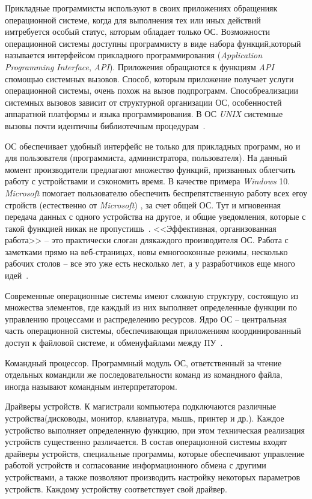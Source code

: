 Прикладные программисты используют в своих приложениях обращенияк операционной системе, когда для выполнения тех или иных действий имтребуется   особый   статус,   которым   обладает   только   ОС.   Возможности операционной   системы   доступны   программисту   в   виде   набора   функций,который называется интерфейсом прикладного программирования (\textit{Application Programming}   \textit{Interface},  \textit{API}).   Приложения   обращаются   к   функциям   \textit{API}   спомощью системных вызовов. Способ, которым приложение получает услуги операционной   системы,   очень   похож   на   вызов   подпрограмм.   Способреализации   системных   вызовов   зависит   от   структурной   организации   ОС, особенностей аппаратной платформы и языка программирования. В ОС \textit{UNIX} системные вызовы почти идентичны библиотечным процедурам~\cite{Oc1}.

ОС   обеспечивает   удобный   интерфейс   не   только   для   прикладных программ,   но   и   для   пользователя   (программиста,   администратора, пользователя). На данный момент производители предлагают множество функций, призванных облегчить работу с устройствами и сэкономить время. В качестве примера \textit{Windows}  10.  \textit{Microsoft} помогает   пользователю   обеспечить   беспрепятственную   работу   всех   егоу стройств (естественно от  \textit{Microsoft}) , за счет общей ОС. Тут и мгновенная передача данных с одного устройства на другое, и общие уведомления, которые с такой функцией никак не пропустишь~\cite{linuxOffDoc}. <<Эффективная, организованная работа>>  – это практически слоган длякаждого производителя ОС. Работа с заметками прямо на веб-страницах, новы емногооконные режимы, несколько рабочих столов – все это уже есть несколько лет, а у разработчиков еще много идей~\cite{linuxOffDoc}.

Современные   операционные   системы   имеют   сложную   структуру, состоящую   из   множества   элементов,   где   каждый   из   них   выполняет определенные функции по управлению процессами и распределению ресурсов.
Ядро ОС – центральная часть операционной системы, обеспечивающая приложениям   координированный   доступ   к   файловой   системе,   и   обменуфайлами между ПУ~\cite{Oc2}.

Командный процессор. Программный модуль ОС, ответственный за чтение отдельных командили же последовательности команд из командного файла, иногда называют командным интерпретатором.

Драйверы устройств. К магистрали  компьютера подключаются различные устройства(дисководы,   монитор,   клавиатура,   мышь,   принтер   и   др.).   Каждое устройство выполняет определенную функцию, при этом техническая реализация устройств существенно различается. В состав операционной системы входят драйверы устройств, специальные программы, которые обеспечивают   управление   работой   устройств   и   согласование информационного обмена с другими устройствами, а также позволяют производить   настройку   некоторых   параметров   устройств.   Каждому устройству соответствует свой драйвер.

